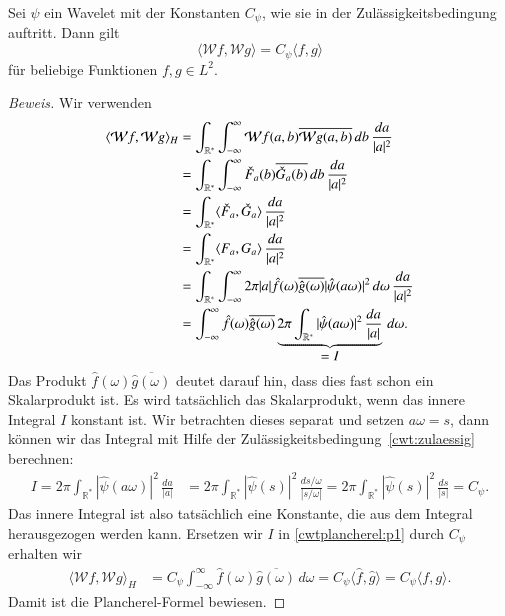 \begin{satz}
\label{satz:wplancherel}
Sei $\psi$ ein Wavelet mit der Konstanten $C_{\psi}$, wie sie in
der Zulässigkeitsbedingung auftritt.
Dann gilt
\begin{equation}
\langle \mathcal{W}f,\mathcal{W}g\rangle
=
C_{\psi}\langle f,g\rangle
\end{equation}
für beliebige Funktionen $f,g\in L^2$.
\end{satz}

\begin{proof}[Beweis]
Wir verwenden 
\begin{align}
\langle \mathcal{W}f, \mathcal{W}g\rangle_H
&=
\int_{\mathbb R^*} \int_{-\infty}^\infty
\mathcal{W}f (a,b)
\overline{\mathcal{W}g (a,b)} \,db \,\frac{da}{|a|^2}
\notag
\\
&=
\int_{\mathbb R^*} \int_{-\infty}^\infty
\check{F}_a(b) \overline{\check{G}_a(b)}\,db\,\frac{da}{|a|^2}
\notag
\\
&=
\int_{\mathbb R^*} 
\langle
\check{F}_a,\check{G}_a
\rangle
\,\frac{da}{|a|^2}
\notag
\\
&=
\int_{\mathbb R^*} \langle F_a, G_a\rangle \,\frac{da}{|a|^2}
\notag
\\
&=
\int_{\mathbb R^*}
\int_{-\infty}^\infty
2\pi |a|\hat{f}(\omega) \overline{\hat{g}(\omega)} |\hat{\psi}(a\omega)|^2
\,d\omega
\,\frac{da}{|a|^2}
\notag
\\
&=
\int_{-\infty}^\infty
\hat{f}(\omega) \overline{\hat{g}(\omega)}
\underbrace{
2\pi
\int_{\mathbb R^*}
|\hat{\psi}(a\omega)|^2
\,\frac{da}{|a|}}_{\displaystyle=I%
}
\,d\omega.
\label{cwtplancherel:p1}
\end{align}
Das Produkt $\hat{f}(\omega)\overline{\hat{g}(\omega)}$ deutet darauf hin,
dass dies fast schon ein Skalarprodukt ist.
Es wird tatsächlich das Skalarprodukt, wenn das innere Integral $I$ konstant
ist.
Wir betrachten dieses separat und setzen $a\omega = s$, dann können
wir das Integral mit Hilfe der Zulässigkeitsbedingung~\eqref{cwt:zulaessig}
berechnen:
\begin{align*}
I
=
2\pi
\int_{\mathbb R^*} |\hat{\psi}(a\omega)|^2 \,\frac{da}{|a|}
&=
2\pi
\int_{\mathbb R^*} |\hat{\psi}(s)|^2 \,\frac{ds/\omega}{|s/\omega|}
=
2\pi
\int_{\mathbb R^*} |\hat{\psi}(s)|^2 \,\frac{ds}{|s|}
=
C_{\psi}.
\end{align*}
Das innere Integral ist also tatsächlich eine Konstante, die aus dem
Integral herausgezogen werden kann.
Ersetzen wir $I$ in \eqref{cwtplancherel:p1} durch $C_{\psi}$ erhalten wir
\begin{align*}
\langle \mathcal{W}f, \mathcal{W}g\rangle_H
&=
C_{\psi}
\int_{-\infty}^\infty \hat{f}(\omega)\overline{\hat{g}(\omega)}\,d\omega
=
C_{\psi}
\langle \hat{f},\hat{g}\rangle
=
C_{\psi}
\langle f,g\rangle.
\end{align*}
Damit ist die Plancherel-Formel bewiesen.
\end{proof}

